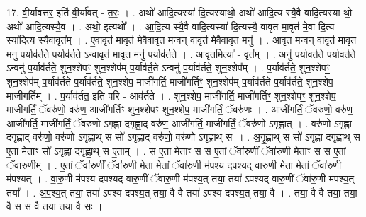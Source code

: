 \documentclass[17pt]{extarticle}
\begin{document}
17. वी॒र्या॑वत्तर॒ इति॑ वी॒र्या॑वत् - त॒रः॒ । . अथो॑ आदि॒त्यस्या॑ दि॒त्यस्याथो॒ अथो॑ आदि॒त्य स्यै॒वै वादि॒त्यस्या थो॒ अथो॑ आदि॒त्यस्यै॒व । . अथो॒ इत्यथो᳚ । . आ॒दि॒त्य स्यै॒वै वादि॒त्यस्या॑ दि॒त्यस्यै॒ वावृत॑ मा॒वृत॑ मे॒वा दि॒त्य स्या॑दि॒त्य स्यै॒वावृत᳚म् । . ए॒वावृत॑ मा॒वृत॑ मे॒वैवावृत॒ मन्वन् वा॒वृत॑ मे॒वैवावृत॒ मनु॑ । . आ॒वृत॒ मन्वन् वा॒वृत॑ मा॒वृत॒ मनु॑ प॒र्याव॑र्तते प॒र्याव॑र्त॒ते ऽन्वा॒वृत॑ मा॒वृत॒ मनु॑ प॒र्याव॑र्तते । . आ॒वृत॒मित्या᳚ - वृत᳚म् । . अनु॑ प॒र्याव॑र्तते प॒र्याव॑र्त॒ते ऽन्वनु॑ प॒र्याव॑र्तते॒ शुन॒श्शेपꣳ॒॒ शुन॒श्शेप॑म् प॒र्याव॑र्त॒ते ऽन्वनु॑ प॒र्याव॑र्तते॒ शुन॒श्शेप᳚म् । . प॒र्याव॑र्तते॒ शुन॒श्शेपꣳ॒॒ शुन॒श्शेप॑म् प॒र्याव॑र्तते प॒र्याव॑र्तते॒ शुन॒श्शेप॒ माजी॑गर्ति॒ माजी॑गर्तिꣳ॒॒ शुन॒श्शेप॑म् प॒र्याव॑र्तते प॒र्याव॑र्तते॒ शुन॒श्शेप॒ माजी॑गर्तिम् । . प॒र्याव॑र्तत॒ इति॑ परि - आव॑र्तते । . शुन॒श्शेप॒ माजी॑गर्ति॒ माजी॑गर्तिꣳ॒॒ शुन॒श्शेपꣳ॒॒ शुन॒श्शेप॒ माजी॑गर्तिं॒ ॅवरु॑णो॒ वरु॑ण॒ आजी॑गर्तिꣳ॒॒ शुन॒श्शेपꣳ॒॒ शुन॒श्शेप॒ माजी॑गर्तिं॒ ॅवरु॑णः । . आजी॑गर्तिं॒ ॅवरु॑णो॒ वरु॑ण॒ आजी॑गर्ति॒ माजी॑गर्तिं॒ ॅवरु॑णो ऽगृह्णा दगृह्णा॒द् वरु॑ण॒ आजी॑गर्ति॒ माजी॑गर्तिं॒ ॅवरु॑णो ऽगृह्णात् । . वरु॑णो ऽगृह्णा दगृह्णा॒द् वरु॑णो॒ वरु॑णो ऽगृह्णा॒थ् स सो॑ ऽगृह्णा॒द् वरु॑णो॒ वरु॑णो ऽगृह्णा॒थ् सः । . अ॒गृ॒ह्णा॒थ् स सो॑ ऽगृह्णा दगृह्णा॒थ् स ए॒ता मे॒ताꣳ सो॑ ऽगृह्णा दगृह्णा॒थ् स ए॒ताम् । . स ए॒ता मे॒ताꣳ स स ए॒तां ॅवा॑रु॒णीं ॅवा॑रु॒णी मे॒ताꣳ स स ए॒तां ॅवा॑रु॒णीम् । . ए॒तां ॅवा॑रु॒णीं ॅवा॑रु॒णी मे॒ता मे॒तां ॅवा॑रु॒णी म॑पश्य दपश्यद् वारु॒णी मे॒ता मे॒तां ॅवा॑रु॒णी म॑पश्यत् । . वा॒रु॒णी म॑पश्य दपश्यद् वारु॒णीं ॅवा॑रु॒णी म॑पश्य॒त् तया॒ तया॑ ऽपश्यद् वारु॒णीं ॅवा॑रु॒णी म॑पश्य॒त् तया᳚ । . अ॒प॒श्य॒त् तया॒ तया॑ ऽपश्य दपश्य॒त् तया॒ वै वै तया॑ ऽपश्य दपश्य॒त् तया॒ वै । . तया॒ वै वै तया॒ तया॒ वै स स वै तया॒ तया॒ वै सः । \newline
\end{document}
